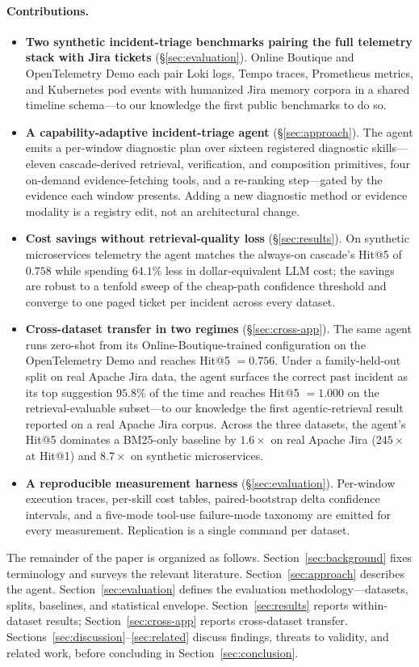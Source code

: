 \paragraph{Contributions.}
\begin{itemize}
  \item \textbf{Two synthetic incident-triage benchmarks pairing the full telemetry stack with Jira tickets} (\S\ref{sec:evaluation}). Online Boutique and OpenTelemetry Demo each pair Loki logs, Tempo traces, Prometheus metrics, and Kubernetes pod events with humanized Jira memory corpora in a shared timeline schema---to our knowledge the first public benchmarks to do so.
  \item \textbf{A capability-adaptive incident-triage agent} (\S\ref{sec:approach}). The agent emits a per-window diagnostic plan over sixteen registered diagnostic skills---eleven cascade-derived retrieval, verification, and composition primitives, four on-demand evidence-fetching tools, and a re-ranking step---gated by the evidence each window presents. Adding a new diagnostic method or evidence modality is a registry edit, not an architectural change.
  \item \textbf{Cost savings without retrieval-quality loss} (\S\ref{sec:results}). On synthetic microservices telemetry the agent matches the always-on cascade's Hit@5 of $0.758$ while spending $64.1\%$ less in dollar-equivalent LLM cost; the savings are robust to a tenfold sweep of the cheap-path confidence threshold and converge to one paged ticket per incident across every dataset.
  \item \textbf{Cross-dataset transfer in two regimes} (\S\ref{sec:cross-app}). The same agent runs zero-shot from its Online-Boutique-trained configuration on the OpenTelemetry Demo and reaches Hit@5 $= 0.756$. Under a family-held-out split on real Apache Jira data, the agent surfaces the correct past incident as its top suggestion $95.8\%$ of the time and reaches Hit@5 $= 1.000$ on the retrieval-evaluable subset---to our knowledge the first agentic-retrieval result reported on a real Apache Jira corpus. Across the three datasets, the agent's Hit@5 dominates a BM25-only baseline by $1.6\times$ on real Apache Jira ($245\times$ at Hit@1) and $8.7\times$ on synthetic microservices.
  \item \textbf{A reproducible measurement harness} (\S\ref{sec:evaluation}). Per-window execution traces, per-skill cost tables, paired-bootstrap delta confidence intervals, and a five-mode tool-use failure-mode taxonomy are emitted for every measurement. Replication is a single command per dataset.
\end{itemize}

The remainder of the paper is organized as follows. Section~\ref{sec:background} fixes terminology and surveys the relevant literature. Section~\ref{sec:approach} describes the agent. Section~\ref{sec:evaluation} defines the evaluation methodology---datasets, splits, baselines, and statistical envelope. Section~\ref{sec:results} reports within-dataset results; Section~\ref{sec:cross-app} reports cross-dataset transfer. Sections~\ref{sec:discussion}--\ref{sec:related} discuss findings, threats to validity, and related work, before concluding in Section~\ref{sec:conclusion}.
